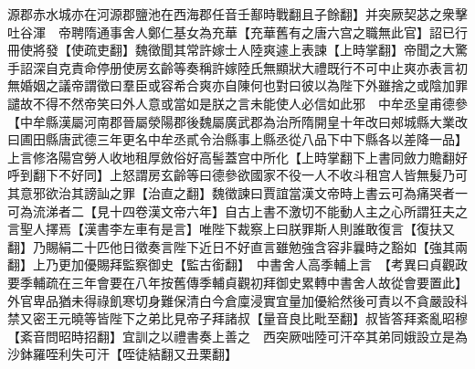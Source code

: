 源郡赤水城亦在河源郡鹽池在西海郡任音壬鄯時戰翻且子餘翻】并突厥契苾之衆擊吐谷渾　帝聘隋通事舍人鄭仁基女為充華【充華舊有之唐六宫之職無此官】詔已行冊使將發【使疏吏翻】魏徵聞其常許嫁士人陸爽遽上表諫【上時掌翻】帝聞之大驚手詔深自克責命停册使房玄齡等奏稱許嫁陸氏無顯狀大禮既行不可中止爽亦表言初無婚姻之議帝謂徵曰羣臣或容希合爽亦自陳何也對曰彼以為陛下外雖捨之或陰加罪譴故不得不然帝笑曰外人意或當如是朕之言未能使人必信如此邪　中牟丞皇甫德參【中牟縣漢屬河南郡晉屬滎陽郡後魏屬廣武郡為治所隋開皇十年改曰郟城縣大業改曰圃田縣唐武德三年更名中牟丞貳令治縣事上縣丞從八品下中下縣各以差降一品】上言修洛陽宫勞人收地租厚斂俗好高髻蓋宫中所化【上時掌翻下上書同斂力贍翻好呼到翻下不好同】上怒謂房玄齡等曰德參欲國家不役一人不收斗租宫人皆無髮乃可其意邪欲治其謗訕之罪【治直之翻】魏徵諫曰賈誼當漢文帝時上書云可為痛哭者一可為流涕者二【見十四卷漢文帝六年】自古上書不激切不能動人主之心所謂狂夫之言聖人擇焉【漢書李左車有是言】唯陛下裁察上曰朕罪斯人則誰敢復言【復扶又翻】乃賜絹二十匹他日徵奏言陛下近日不好直言雖勉強含容非曩時之豁如【強其兩翻】上乃更加優賜拜監察御史【監古銜翻】　中書舍人高季輔上言　【考異曰貞觀政要季輔疏在三年會要在八年按舊傳季輔貞觀初拜御史累轉中書舍人故從會要置此】外官卑品猶未得祿飢寒切身難保清白今倉廩浸實宜量加優給然後可責以不貪嚴設科禁又密王元曉等皆陛下之弟比見帝子拜諸叔【量音良比毗至翻】叔皆答拜紊亂昭穆【紊音問昭時招翻】宜訓之以禮書奏上善之　西突厥咄陸可汗卒其弟同娥設立是為沙鉢羅咥利失可汗【咥徒結翻又丑栗翻】

